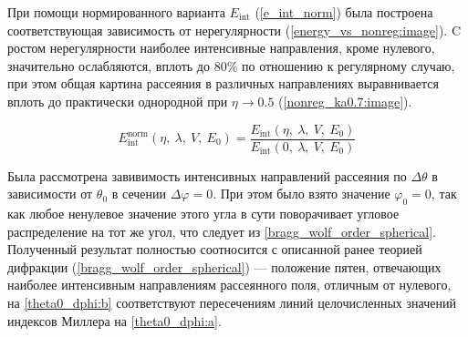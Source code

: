 
При помощи нормированного варианта $E_{\textrm{int}}$ (\autoref{e_int_norm}) была построена соответствующая зависимость от нерегулярности (\autoref{energy_vs_nonreg:image}). C ростом нерегулярности наиболее интенсивные направления, кроме нулевого, значительно ослабляются, вплоть до 80\% по отношению к регулярному случаю, при этом общая картина рассеяния в различных направлениях выравнивается вплоть до практически однородной при $\eta \to 0.5$ (\autoref{nonreg_ka0.7:image}).

    \begin{equation}
        E_{\textrm{int}}^{\textrm{norm}} \left( \eta,\:\lambda, \:V, \:E_0 \right) = \frac{E_{\textrm{int}} \left( \eta,\:\lambda, \:V, \:E_0 \right)}{E_{\textrm{int}} \left( 0,\:\lambda, \:V, \:E_0 \right)}\label{e_int_norm}
    \end{equation}


Была рассмотрена завивимость интенсивных направлений рассеяния по $\Delta \theta$ в зависимости от $\theta_0$ в сечении $\Delta \varphi = 0$. При этом было взято значение $\varphi_0 = 0$, так как любое ненулевое значение этого угла в сути поворачивает угловое распределение на тот же угол, что следует из \autoref{bragg_wolf_order_spherical}. Полученный результат полностью соотносится с описанной ранее теорией дифракции (\autoref{bragg_wolf_order_spherical}) --- положение пятен, отвечающих наиболее интенсивным направлениям рассеянного поля, отличным от нулевого, на \autoref{theta0_dphi:b} соответствуют пересечениям линий целочисленных значений индексов Миллера на \autoref{theta0_dphi:a}.

